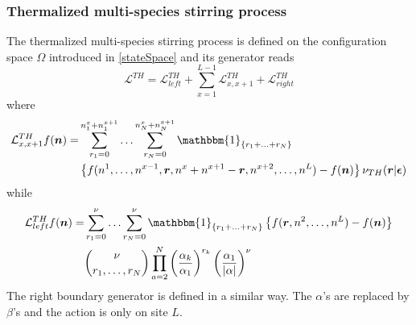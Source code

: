\documentclass[11pt]{article}
\numberwithin{equation}{section}
\numberwithin{equation}{subsection}
\begin{document}
\subsubsection{Thermalized multi-species stirring process}
The thermalized multi-species stirring process is defined on the configuration space $\Omega$ introduced in \eqref{stateSpace} and its generator reads
\begin{equation}\label{thermalizedGenerator}
	\mathcal{L}^{TH}=\mathcal{L}_{left}^{TH}+\sum_{x=1}^{L-1}\mathcal{L}_{x,x+1}^{TH}+\mathcal{L}_{right}^{TH}
\end{equation}
where 
\begin{equation}\label{bulkThermalized}
	\begin{split}
	\mathcal{L}_{x,x+1}^{TH}f(\bm{n})=&\sum_{r_{1}=0}^{n_{1}^{x}+n_{1}^{x+1}}\ldots\sum_{r_{N}=0}^{n_{N}^{x}+n_{N}^{x+1}}\mathbbm{1}_{\{r_{1}+\ldots+r_{N}\}}
	\\&
	\left\{f(n^{1},\ldots,n^{x-1},\bm{r},n^{x}+n^{x+1}-\bm{r},n^{x+2},\ldots,n^{L})-f(\bm{n})\right\}\nu_{TH}(\bm{r}|\bm{\epsilon})
	\end{split}
\end{equation}
while
\begin{equation}\label{boundaryThermalized}
	\begin{split}
		\mathcal{L}_{left}^{TH}f(\bm{n})=&\sum_{r_{1}=0}^{\nu}\ldots\sum_{r_{N}=0}^{\nu}\mathbbm{1}_{\{r_{1}+\ldots+r_{N}\}}\left\{f(\bm{r},n^{2},\ldots,n^{L})-f(\bm{n})\right\}\\&
		\binom{\nu}{r_{1},\ldots, r_{N}}\prod_{a=2}^{N}\left(\frac{\alpha_{k}}{\alpha_{1}}\right)^{r_{k}}\left(\frac{\alpha_{1}}{|\alpha|}\right)^{\nu}
		\end{split}
	\end{equation}
The right boundary generator is defined in a similar way. The $\alpha$'s are replaced by $\beta$'s and the action is only on site $L$. 
\end{document}
